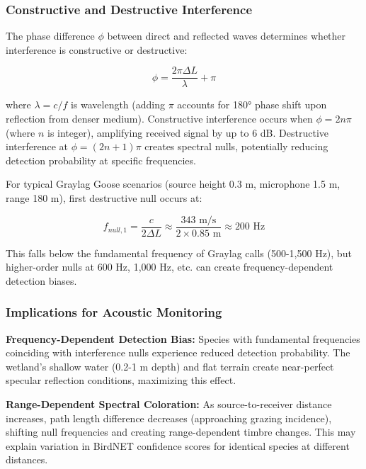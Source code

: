 \documentclass[twocolumn]{article}
\begin{document}
\subsubsection{Constructive and Destructive Interference}

The phase difference $\phi$ between direct and reflected waves determines whether interference is constructive or destructive:

\begin{equation}
\phi = \frac{2\pi \Delta L}{\lambda} + \pi
\label{eq:phase_difference}
\end{equation}

where $\lambda = c/f$ is wavelength (adding $\pi$ accounts for 180° phase shift upon reflection from denser medium). Constructive interference occurs when $\phi = 2n\pi$ (where $n$ is integer), amplifying received signal by up to 6 dB. Destructive interference at $\phi = (2n+1)\pi$ creates spectral nulls, potentially reducing detection probability at specific frequencies.

For typical Graylag Goose scenarios (source height 0.3 m, microphone 1.5 m, range 180 m), first destructive null occurs at:

\begin{equation}
f_{null,1} = \frac{c}{2\Delta L} \approx \frac{343 \text{ m/s}}{2 \times 0.85 \text{ m}} \approx 200 \text{ Hz}
\label{eq:null_frequency}
\end{equation}

This falls below the fundamental frequency of Graylag calls (500-1,500 Hz), but higher-order nulls at 600 Hz, 1,000 Hz, etc. can create frequency-dependent detection biases.

\subsubsection{Implications for Acoustic Monitoring}

\textbf{Frequency-Dependent Detection Bias:} Species with fundamental frequencies coinciding with interference nulls experience reduced detection probability. The wetland's shallow water (0.2-1 m depth) and flat terrain create near-perfect specular reflection conditions, maximizing this effect.

\textbf{Range-Dependent Spectral Coloration:} As source-to-receiver distance increases, path length difference decreases (approaching grazing incidence), shifting null frequencies and creating range-dependent timbre changes. This may explain variation in BirdNET confidence scores for identical species at different distances.
\end{document}
